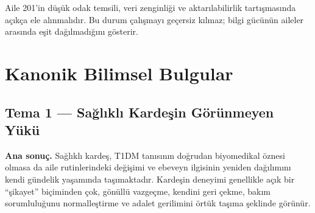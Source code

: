 \documentclass[
  turkish,
  a4paper,
  DIV=11,
  numbers=noendperiod]{scrreprt}
\begin{document}
Aile 201'in düşük odak temsili, veri zenginliği ve aktarılabilirlik
tartışmasında açıkça ele alınmalıdır. Bu durum çalışmayı geçersiz
kılmaz; bilgi gücünün aileler arasında eşit dağılmadığını gösterir.

\chapter{Kanonik Bilimsel Bulgular}\label{sec-bulgular}

\section{Tema 1 --- Sağlıklı Kardeşin Görünmeyen Yükü}\label{tema-1}

\textbf{Ana sonuç.} Sağlıklı kardeş, T1DM tanısının doğrudan biyomedikal
öznesi olmasa da aile rutinlerindeki değişimi ve ebeveyn ilgisinin
yeniden dağılımını kendi gündelik yaşamında taşımaktadır. Kardeşin
deneyimi genellikle açık bir ``şikayet'' biçiminden çok, gönüllü
vazgeçme, kendini geri çekme, bakım sorumluluğunu normalleştirme ve
adalet gerilimini örtük taşıma şeklinde görünür.
\end{document}
